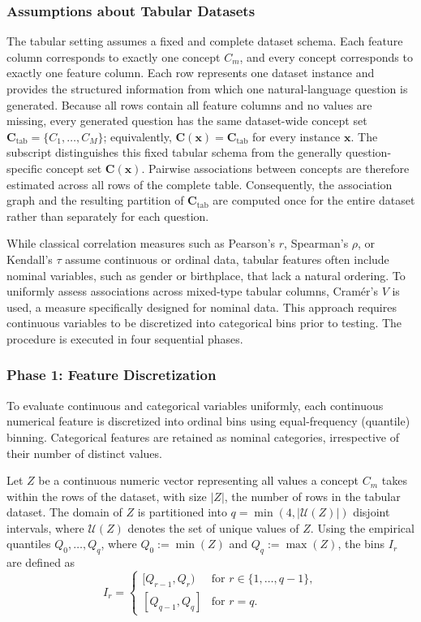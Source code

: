 \subsubsection{Assumptions about Tabular Datasets}

The tabular setting assumes a fixed and complete dataset schema. Each feature column corresponds to exactly one concept $C_m$, and every concept corresponds to exactly one feature column. Each row represents one dataset instance and provides the structured information from which one natural-language question is generated. Because all rows contain all feature columns and no values are missing, every generated question has the same dataset-wide concept set $\mathbf{C}_{\mathrm{tab}}=\{C_1,\ldots,C_M\}$; equivalently, $\mathbf{C}(\mathbf{x})=\mathbf{C}_{\mathrm{tab}}$ for every instance $\mathbf{x}$. The subscript distinguishes this fixed tabular schema from the generally question-specific concept set $\mathbf{C}(\mathbf{x})$. Pairwise associations between concepts are therefore estimated across all rows of the complete table. Consequently, the association graph and the resulting partition of $\mathbf{C}_{\mathrm{tab}}$ are computed once for the entire dataset rather than separately for each question.

While classical correlation measures such as Pearson's $r$, Spearman's $\rho$, or Kendall's $\tau$ \cite{fieldDiscoveringStatisticsUsing2017} assume continuous or ordinal data, tabular features often include nominal variables, such as gender or birthplace, that lack a natural ordering. To uniformly assess associations across mixed-type tabular columns, Cramér's $V$ \cite{cramer1946mathematical} is used, a measure specifically designed for nominal data. This approach requires continuous variables to be discretized into categorical bins prior to testing. The procedure is executed in four sequential phases.

\subsubsection{Phase 1: Feature Discretization}

To evaluate continuous and categorical variables uniformly, each continuous numerical feature is discretized into ordinal bins using equal-frequency (quantile) binning. Categorical features are retained as nominal categories, irrespective of their number of distinct values.

Let $Z$ be a continuous numeric vector representing all values a concept $C_m$ takes within the rows of the dataset, with size $|Z|$, the number of rows in the tabular dataset. The domain of $Z$ is partitioned into $q = \min(4, |\mathcal{U}(Z)|)$ disjoint intervals, where $\mathcal{U}(Z)$ denotes the set of unique values of $Z$. Using the empirical quantiles $Q_0, \dots, Q_q$, where $Q_0 := \min(Z)$ and $Q_q := \max(Z)$, the bins $I_r$ are defined as
\begin{equation}
I_r =
\begin{cases}
[Q_{r-1}, Q_r) & \text{for } r \in \{1, \dots, q-1\}, \\[2pt]
[Q_{q-1}, Q_q] & \text{for } r = q.
\end{cases}
\end{equation}


